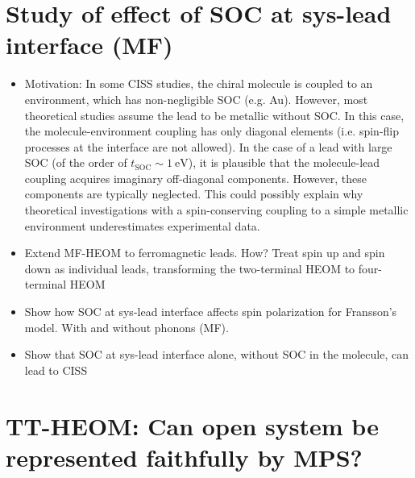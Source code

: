\documentclass{article}
\begin{document}
\section{Study of effect of SOC at sys-lead interface (MF)}
\begin{itemize}
	\item Motivation: In some CISS studies, the chiral molecule is coupled to an environment, which has non-negligible SOC (e.g. Au). However, most theoretical studies assume the lead to be metallic without SOC. In this case, the molecule-environment coupling has only diagonal elements (i.e. spin-flip processes at the interface are not allowed). In the case of a lead with large SOC (of the order of $t_\mathrm{SOC} \sim \SI{1}{\electronvolt}$), it is plausible that the molecule-lead coupling acquires imaginary off-diagonal components. However, these components are typically neglected. This could possibly explain why theoretical investigations with a spin-conserving coupling to a simple metallic environment underestimates experimental data. 
	\item[$\checkmark$] Extend MF-HEOM to ferromagnetic leads. How? Treat spin up and spin down as individual leads, transforming the two-terminal HEOM to four-terminal HEOM
	\item Show how SOC at sys-lead interface affects spin polarization for Fransson's model. With and without phonons (MF).
	\item Show that SOC at sys-lead interface alone, without SOC in the molecule, can lead to CISS
\end{itemize}
\section{TT-HEOM: Can open system be represented faithfully by MPS?}
\printbibliography
\end{document}
